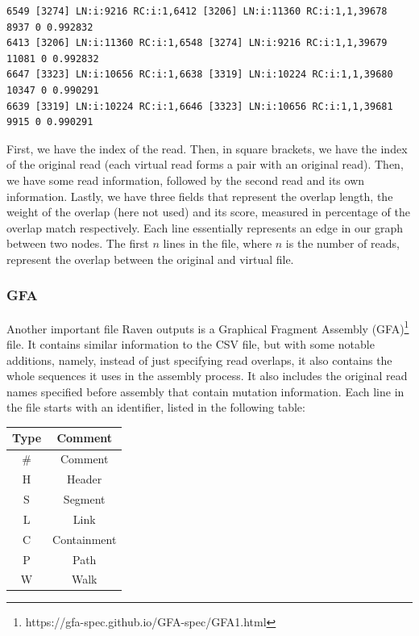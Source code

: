 \documentclass[times, utf8, diplomski, english]{fer_eng}
\begin{document}
\begin{lstlisting}
6549 [3274] LN:i:9216 RC:i:1,6412 [3206] LN:i:11360 RC:i:1,1,39678 8937 0 0.992832
6413 [3206] LN:i:11360 RC:i:1,6548 [3274] LN:i:9216 RC:i:1,1,39679 11081 0 0.992832
6647 [3323] LN:i:10656 RC:i:1,6638 [3319] LN:i:10224 RC:i:1,1,39680 10347 0 0.990291
6639 [3319] LN:i:10224 RC:i:1,6646 [3323] LN:i:10656 RC:i:1,1,39681 9915 0 0.990291
\end{lstlisting}

First, we have the index of the read. Then, in square brackets, we have the index of the original read (each virtual read forms a pair with an original read). Then, we have some read information, followed by the second read and its own information. Lastly, we have three fields that represent the overlap length, the weight of the overlap (here not used) and its score, measured in percentage of the overlap match respectively. Each line essentially represents an edge in our graph between two nodes. The first $n$ lines in the file, where $n$ is the number of reads, represent the overlap between the original and virtual file.

\subsubsection{GFA}
\label{subsubsec:gfa}

Another important file Raven outputs is a Graphical Fragment Assembly (GFA)\footnote{https://gfa-spec.github.io/GFA-spec/GFA1.html} file. It contains similar information to the CSV file, but with some notable additions, namely, instead of just specifying read overlaps, it also contains the whole sequences it uses in the assembly process. It also includes the original read names specified before assembly that contain mutation information. Each line in the file starts with an identifier, listed in the following table:

\begin{center}
	\begin{tabular}{ |c|c| }
		\hline
		\textbf{Type} & \textbf{Comment} \\
		\hline
		\# & Comment \\
		\hline
		H & Header \\
		\hline
		S & Segment \\
		\hline
		L & Link \\
		\hline
		C & Containment \\
		\hline
		P & Path \\
		\hline
		W & Walk \\
		\hline
	\end{tabular}
\end{center}
\end{document}
